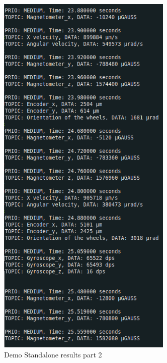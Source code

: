 \documentclass[12pt]{report}%
\begin{document}
\begin{figure}[ht]
	\centering
	\includegraphics[width=\textwidth, height=18cm]{standalone_2}
  	\caption{Demo Standalone results part 2}
  	\label{fig:res2}
\end{figure}
\end{document}
